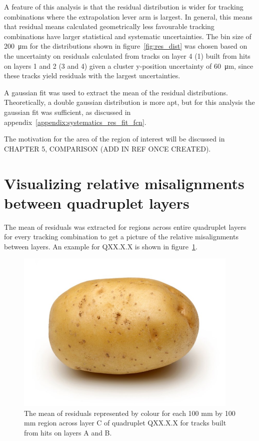 A feature of this analysis is that the residual distribution is wider for tracking combinations where the extrapolation lever arm is largest. In general, this means that residual means calculated geometrically less favourable tracking combinations have larger statistical and systematic uncertainties. The bin size of \SI{200}{\micro\meter} for the distributions shown in figure~\ref{fig:res_dist} was chosen based on the uncertainty on residuals calculated from tracks on layer 4 (1) built from hits on layers 1 and 2 (3 and 4) given a cluster y-position uncertainty of \SI{60}{\micro\meter}, since these tracks yield residuals with the largest uncertainties.

A gaussian fit was used to extract the mean of the residual distributions. Theoretically, a double gaussian distribution is more apt, but for this analysis the gaussian fit was sufficient, as discussed in appendix~\ref{appendix:systematics_res_fit_fcn}.

The motivation for the area of the region of interest will be discussed in CHAPTER 5, COMPARISON (ADD IN REF ONCE CREATED).

\section{Visualizing relative misalignments between quadruplet layers}

The mean of residuals was extracted for regions across entire quadruplet layers for every tracking combination to get a picture of the relative misalignments between layers. An example for QXX.X.X is shown in figure~\ref{fig:res_mean_th2}.

\begin{figure}
    \centering
    \includegraphics[width = 0.95\textwidth]{figures/potato.jpg}
    \caption{The mean of residuals represented by colour for each 100 mm by 100 mm region across layer C of quadruplet QXX.X.X for tracks built from hits on layers A and B.}
    \label{fig:res_mean_th2}
\end{figure}

